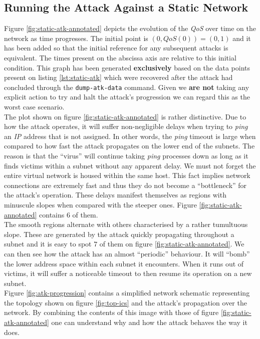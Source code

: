         \subsection{Running the Attack Against a Static Network}
            Figure \ref{fig:static-atk-annotated} depicts the evolution of the \textit{QoS} over time on the network as time progresses. The initial point is $(0, QoS(0)) = (0, 1)$ and it has been added so that the initial reference for any subsequent attacks is equivalent. The times present on the abscissa axis are relative to this initial condition. This graph has been generated \textbf{exclusively} based on the data points present on listing \ref{lst:static-atk} which were recovered after the attack had concluded through the \texttt{dump-atk-data} command. Given we \textbf{are not} taking any explicit action to try and halt the attack's progression we can regard this as the worst case scenario.\\

            The plot shown on figure \ref{fig:static-atk-annotated} is rather distinctive. Due to how the attack operates, it will suffer non-negligible delays when trying to \textit{ping} an \textit{IP} address that is not assigned. In other words, the \textit{ping} timeout is large when compared to how fast the attack propagates on the lower end of the subnets. The reason is that the ``virus'' will continue taking \textit{ping} processes down as long as it finds victims within a subnet without any apparent delay. We must not forget the entire virtual network is housed within the same host. This fact implies network connections are extremely fast and thus they do not become a ``bottleneck'' for the attack's operation. These delays manifest themselves as regions with minuscule slopes when compared with the steeper ones. Figure \ref{fig:static-atk-annotated} contains $6$ of them.\\

            The smooth regions alternate with others characterised by a rather tumultuous slope. These are generated by the attack quickly propagating throughout a subnet and it is easy to spot $7$ of them on figure \ref{fig:static-atk-annotated}. We can then see how the attack has an almost ``periodic'' behaviour. It will ``bomb'' the lower address space within each subnet it encounters. When it runs out of victims, it will suffer a noticeable timeout to then resume its operation on a new subnet.\\

            Figure \ref{fig:atk-progression} contains a simplified network schematic representing the topology shown on figure \ref{fig:top-ics} and the attack's propagation over the network. By combining the contents of this image with those of figure \ref{fig:static-atk-annotated} one can understand why and how the attack behaves the way it does.\\


